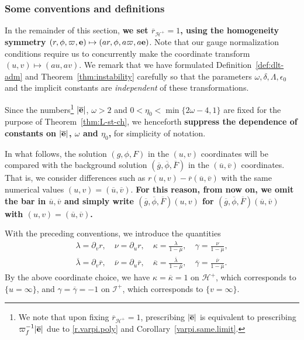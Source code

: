 \documentclass[10pt, reqno]{amsart}
\theoremstyle{definition}
\theoremstyle{remark}
\theoremstyle{conjecture}
\numberwithin{equation}{section}
\newcommand{\set}[1]{\{#1\}}
\newcommand{\rd}{\partial}
\newcommand{\0}{\emptyset}
\newcommand{\gmm}{\gamma}
\newcommand{\dlt}{\delta}
\newcommand{\eps}{\epsilon}
\newcommand{\kpp}{\kappa}
\newcommand{\lmb}{\lambda}
\newcommand{\Lmb}{\Lambda}
\newcommand{\omg}{\omega}
\newcommand{\bfe}{{\bf e}}
\newcommand{\calH}{\mathcal H}
\newcommand{\calI}{\mathcal I}
\newcommand{\dur}{\nu}
\newcommand{\dvr}{\lmb}
\newcommand{\EH}{\calH^{+}}
\newcommand{\e}{\bfe}							%
\newcommand{\NI}{\calI^{+}}						%
\newcommand{\gbg}{\overline{g}}					%
\newcommand{\Fbg}{\overline{F}}					%
\newcommand{\ubg}{\overline{u}}					%
\newcommand{\vbg}{\overline{v}}					%
\newcommand{\phibg}{\overline{\phi}}				%
\newcommand{\dvrbg}{\overline{\dvr}}				%
\newcommand{\durbg}{\overline{\dur}}				%
\newcommand{\rbg}{\overline{r}}					%
\newcommand{\mubg}{\overline{\mu}}				%
\newcommand{\kppbg}{\overline{\kpp}}					%
\newcommand{\gmmbg}{\overline{\gmm}}					%
\newcommand{\ebg}{\overline{\e}}					%
\begin{document}
\subsubsection*{Some conventions and definitions}
In the remainder of this section, {\bf we set $\rbg_{\EH} = 1$, using the homogeneity symmetry $(r, \phi, \varpi, \e)\mapsto (a r, \phi, a \varpi, a \bfe)$}. Note that our gauge normalization conditions require us to concurrently make the coordinate transform $(u, v) \mapsto (a u, a v)$. We remark that we have formulated Definition~\ref{def:dlt-adm} and Theorem~\ref{thm:instability} carefully so that the parameters $\omg, \dlt, \Lmb, \eps_{0}$ and the implicit constants are \emph{independent} of these transformations.

Since the numbers\footnote{We note that upon fixing $\rbg_{\EH}=1$, prescribing $|\ebg|$ is equivalent to prescribing $\varpi_f^{-1}|\ebg|$ due to \eqref{r.varpi.poly} and Corollary~\ref{varpi.same.limit}.} $|\ebg|$, $\omg > 2$ and $0 < \eta_{0} < \min\{2\omg-4, 1\}$ are fixed for the purpose of Theorem~\ref{thm:L-st-ch}, we henceforth {\bf suppress the dependence of constants on $|\ebg|$, $\omg$ and $\eta_{0}$,} for simplicity of notation.

In what follows,  the solution $(g, \phi, F)$ in the $(u, v)$ coordinates will be compared with the background solution $(\gbg, \phibg, \Fbg)$ in the $(\ubg, \vbg)$ coordinates. That is, we consider differences such as $r(u,v) - \rbg(\ubg, \vbg)$ with the same numerical values $(u, v) = (\ubg, \vbg)$. {\bf For this reason, from now on, we omit the bar in $\ubg, \vbg$ and simply write $(\gbg, \phibg, \Fbg) (u, v)$ for $(\gbg, \phibg, \Fbg) (\ubg, \vbg)$ with $(u, v) = (\ubg, \vbg)$.}

With the preceding conventions, we introduce the quantities
\begin{gather*}
	\dvr = \rd_{v} r, \quad \dur = \rd_{u} r, \quad
	\kpp = \frac{\dvr}{1-\mu}, \quad \gmm = \frac{\dur}{1-\mu}, \\
	\dvrbg = \rd_{v} \rbg, \quad \durbg = \rd_{u} \rbg, \quad
	\kppbg = \frac{\dvrbg}{1-\mubg}, \quad \gmmbg = \frac{\durbg}{1-\mubg}.
\end{gather*}
By the above coordinate choice, we have $\kpp = \kppbg = 1$ on $\EH$, which corresponds to $\set{u = \infty}$, and $\gmm = \gmmbg = -1$ on $\NI$, which corresponds to $\set{v = \infty}$.
\end{document}
